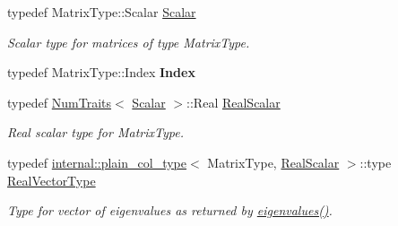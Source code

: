 \begin{DoxyCompactItemize}
typedef Matrix\+Type\+::\+Scalar \hyperlink{class_eigen_1_1_arpack_generalized_self_adjoint_eigen_solver_ab1182405bfe87a505d4b7a8311c661ec}{Scalar}
\begin{DoxyCompactList}\small\item\em Scalar type for matrices of type {\ttfamily Matrix\+Type}. \end{DoxyCompactList}\item 
\mbox{\label{class_eigen_1_1_arpack_generalized_self_adjoint_eigen_solver_a2593f8953630418bd5641086151610c1}} 
typedef Matrix\+Type\+::\+Index {\bfseries Index}
\item 
typedef \hyperlink{group___core___module_struct_eigen_1_1_num_traits}{Num\+Traits}$<$ \hyperlink{class_eigen_1_1_arpack_generalized_self_adjoint_eigen_solver_ab1182405bfe87a505d4b7a8311c661ec}{Scalar} $>$\+::Real \hyperlink{class_eigen_1_1_arpack_generalized_self_adjoint_eigen_solver_a2555af55e53bf9de894a49e639be2e1e}{Real\+Scalar}
\begin{DoxyCompactList}\small\item\em Real scalar type for {\ttfamily Matrix\+Type}. \end{DoxyCompactList}\item 
typedef \hyperlink{struct_eigen_1_1internal_1_1plain__col__type}{internal\+::plain\+\_\+col\+\_\+type}$<$ Matrix\+Type, \hyperlink{class_eigen_1_1_arpack_generalized_self_adjoint_eigen_solver_a2555af55e53bf9de894a49e639be2e1e}{Real\+Scalar} $>$\+::type \hyperlink{class_eigen_1_1_arpack_generalized_self_adjoint_eigen_solver_a47a5becb6dda25dbd90a1704a8247dd8}{Real\+Vector\+Type}
\begin{DoxyCompactList}\small\item\em Type for vector of eigenvalues as returned by \hyperlink{class_eigen_1_1_arpack_generalized_self_adjoint_eigen_solver_ab46900dafdd11a8ac05a662c6b41480d}{eigenvalues()}. \end{DoxyCompactList}\end{DoxyCompactItemize}
